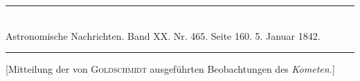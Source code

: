 \clearpage
\hypertarget{native-469-notice1842}{}
\begin{center}
\rule{0.55\linewidth}{0.4pt}\\[2pt]
Astronomische Nachrichten. Band XX. Nr. 465. Seite 160. 5. Januar 1842.\\[2pt]
\rule{0.55\linewidth}{0.4pt}
\end{center}

[Mitteilung der von \textsc{Goldschmidt} ausgeführten Beobachtungen des \emph{Kometen.}]


